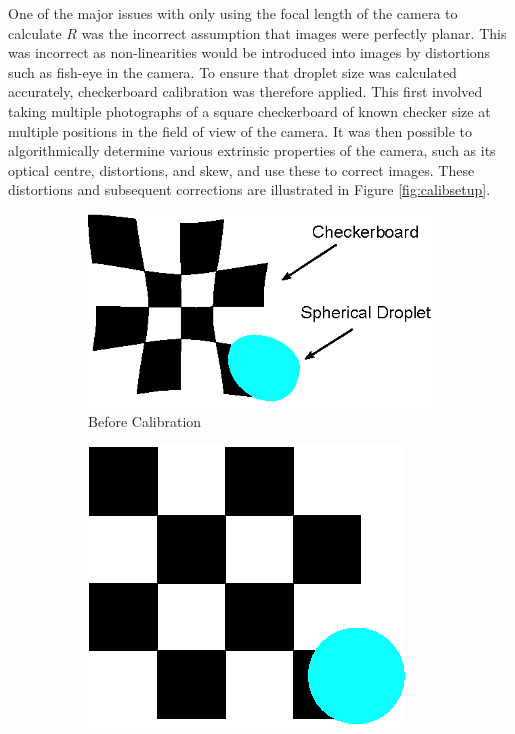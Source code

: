 \documentclass{physics_article_B}
\begin{document}
            One of the major issues with only using the focal length of the camera to calculate $R$ was the incorrect assumption that images were perfectly planar. This was incorrect as non-linearities would be introduced into images by distortions such as fish-eye in the camera. To ensure that droplet size was calculated accurately, checkerboard calibration was therefore applied. This first involved taking multiple photographs of a square checkerboard of known checker size at multiple positions in the field of view of the camera. It was then possible to algorithmically determine various extrinsic properties of the camera, such as its optical centre, distortions, and skew\cite{CameraCalibration}, and use these to correct images. These distortions and subsequent corrections are illustrated in Figure \ref{fig:calibsetup}. 
                \begin{figure}[H]
                    \centering
                  \begin{subfigure}[b]{0.48\textwidth}
                        \hspace*{1.5cm} \includegraphics[width=\textwidth]{Figures/Distorted.eps}
                        \caption{Before Calibration}
                        \label{fig:calibsetup:distorted}
                    \end{subfigure}
                    \begin{subfigure}[b]{0.48\textwidth}
                        \hspace{1.8cm}\includegraphics[scale=1.27]{Figures/Undistorted.eps}

\end{subfigure}
\end{figure}
\end{document}
